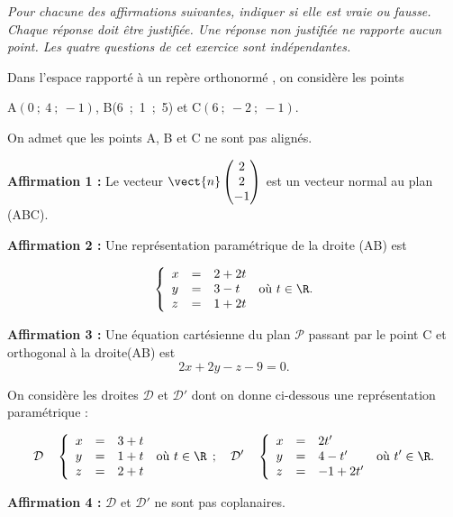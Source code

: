 \medskip

\emph{Pour chacune des affirmations suivantes, indiquer si elle est vraie ou fausse. Chaque réponse doit être justifiée. Une réponse non justifiée ne rapporte aucun point.
Les quatre questions de cet exercice sont indépendantes.}

\medskip

Dans l'espace rapporté à un repère orthonormé \Oijk, on considère les points 
\begin{center}A$(0~;~ 4~;~-1)$, \quad B(6~;~1~;~5) \quad et \quad C$(6~;~-2~;~-1)$.\end{center} 

On admet que les points A, B et C ne sont pas alignés.

\medskip

\textbf{Affirmation 1 :} Le vecteur $\vect{n}\begin{pmatrix}2\\2\\-1\end{pmatrix}$ est un vecteur normal au plan (ABC).

\medskip

\textbf{Affirmation 2 :} Une représentation paramétrique de la droite (AB) est 

\[\left\{\begin{array}{l c l}
x &=& 2 + 2t\\
y &=& 3 - t\\
z &=& 1 + 2t
\end{array}\right. \:\text{où } t \in \R.\]

\medskip

\textbf{Affirmation 3 :} Une équation cartésienne du plan $\mathcal{P}$ passant par le point C et orthogonal à la droite(AB) est
\[2x + 2y - z- 9 = 0.\]

\bigskip

On considère les droites $\mathcal{D}$ et $\mathcal{D}'$ dont on donne ci-dessous une représentation paramétrique :

\[\mathcal{D}\quad \left\{\begin{array}{l c l}
x&=&3+t\\
y&=&1+t\\
z&=&2+t
\end{array}\right. \:\text{où } t \in \R \:\:;\quad
\mathcal{D}'\quad \left\{\begin{array}{l c l}
x&= &2t'\\
y&=&4 - t'\\
z&=&-1 + 2t'
\end{array}\right. \:\text{où } t' \in \R.\]

\textbf{Affirmation 4 :} $\mathcal{D}$ et $\mathcal{D}'$ ne sont pas coplanaires.

\bigskip
